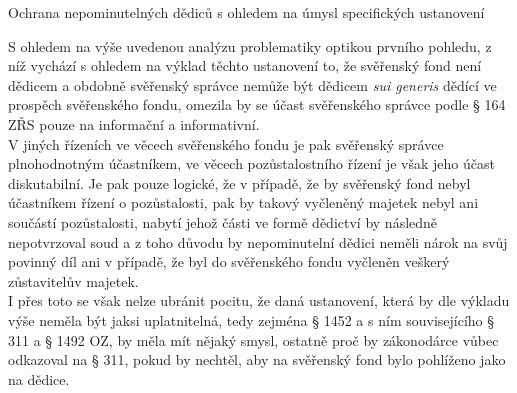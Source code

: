 \documentclass{article}
\begin{document}
 
    \begin{enumerate}
 {\Large\item[2.] Ochrana nepominutelných dědiců s ohledem na úmysl specifických ustanovení}
 \end{enumerate}

 
 S ohledem na výše uvedenou analýzu problematiky optikou prvního pohledu, z níž vychází s ohledem na výklad těchto ustanovení to, že svěřenský fond není dědicem a obdobně svěřenský správce nemůže být dědicem \textit{sui generis} dědící ve prospěch svěřenského fondu, omezila by se účast svěřenského správce podle § 164 ZŘS pouze na informační a informativní.\\
 
 V jiných řízeních ve věcech svěřenského fondu je pak svěřenský správce plnohodnotným účastníkem, ve věcech pozůstalostního řízení je však jeho účast diskutabilní. Je pak pouze logické, že v případě, že by svěřenský fond nebyl účastníkem řízení o pozůstalosti, pak by takový vyčleněný majetek nebyl ani součástí pozůstalosti, nabytí jehož části ve formě dědictví by následně nepotvrzoval soud a z toho důvodu by nepominutelní dědici neměli nárok na svůj povinný díl ani v případě, že byl do svěřenského fondu vyčleněn veškerý zůstavitelův majetek.\\
 
 I přes toto se však nelze ubránit pocitu, že daná ustanovení, která by dle výkladu výše neměla být jaksi uplatnitelná, tedy zejména § 1452 a s ním souvisejícího § 311 a § 1492 OZ, by měla mít nějaký smysl, ostatně proč by zákonodárce vůbec odkazoval na § 311, pokud by nechtěl, aby na svěřenský fond bylo pohlíženo jako na dědice.\\
 
\end{document}
